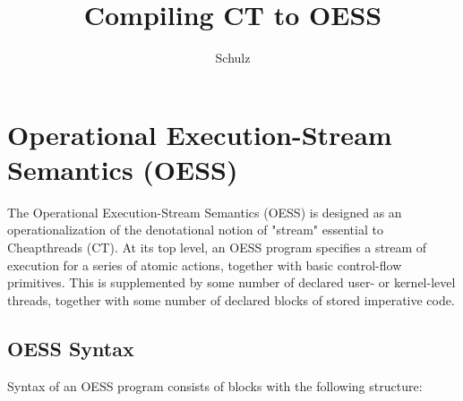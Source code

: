 \documentclass{article}
\title{Compiling CT to OESS}
\author{Schulz}
\begin{document}
\maketitle

\section{Operational Execution-Stream Semantics (OESS)}

The Operational Execution-Stream Semantics (OESS) is designed as an operationalization of the denotational notion of "stream" essential to Cheapthreads (CT).  At its top level, an OESS program specifies a stream of execution for a series of atomic actions, together with basic control-flow primitives.  This is supplemented by some number of declared user- or kernel-level threads, together with some number of declared blocks of stored imperative code.\\

\subsection{OESS Syntax}

Syntax of an OESS program consists of blocks with the following structure:\\

\end{document}
